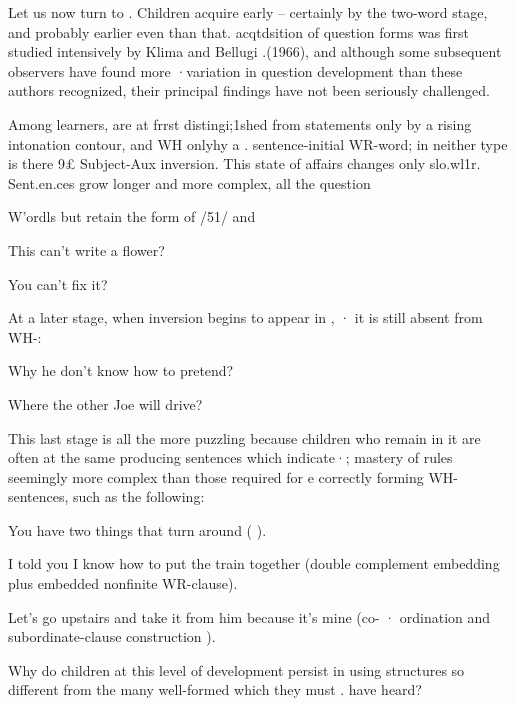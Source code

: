 Let us now turn to . Children acquire  early --
certainly by the two-word stage, and probably earlier even than that. acqtdsition of question forms was first studied intensively by Klima and Bellugi .(1966), and although some subsequent observers have found more ·variation in question development than these authors recognized, their principal findings have not been seriously challenged.

Among  learners,   are at frrst distin\-gi;1shed from statements only by a rising intonation contour, and WH\- onlyhy a . sentence-initial WR-word; in neither type is there 9£ Subject-Aux inversion. This state of affairs changes only slo.wl1r. Sent.en.ces grow longer and more complex, all the question

W'ordls but   retain the form of /51/ and


\ea\label{ex:51}
 This can't write a flower?
\glt
\z

\ea\label{ex:52}
 You can't fix it?
\glt
\z

At a later stage, when inversion begins to appear in  , · it is still absent from WH-:

\ea\label{ex:53}
 Why he don't know how to pretend?
\glt
\z

\ea\label{ex:54}
 Where the other Joe will drive?
\glt
\z

This last stage is all the more puzzling because children who remain in it are often at the same  producing sentences which indicate·; mastery of rules seemingly more complex than those required for e correctly forming  WH-sentences, such as the following:

\ea\label{ex:55}
 You have two things that turn around ( ).
\glt
\z

\ea\label{ex:56}
 I told you I know how to put the train together (double comple\-ment embedding plus embedded nonfinite WR-clause).
\glt
\z

\ea\label{ex:57}
 Let's go upstairs and take it from him because it's mine (co- · ordination and subordinate-clause  construction ).
\glt
\z

Why do children at this level of development persist in using structures so different from the many well-formed  which they must . have heard?

